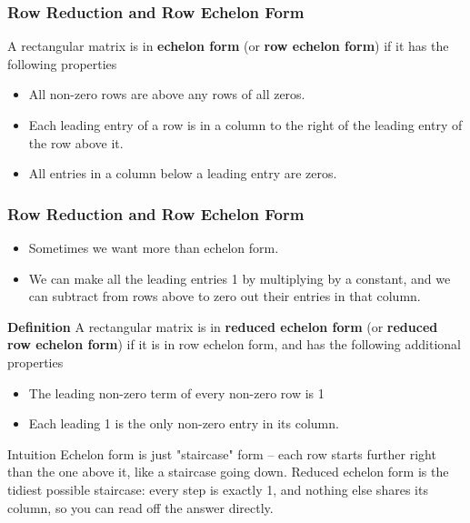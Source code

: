   \begin{frame}[fragile]\frametitle{Row Reduction and Row Echelon Form}
 A rectangular matrix is in \textbf{echelon form}
(or \textbf{row echelon form}) if it has the following properties
\begin{itemize}
 \item All non-zero rows are above any rows of all zeros.
 \item Each leading entry of a row is in a column to the right of the leading
 entry of the row above it.
 \item All entries in a column below a leading entry are zeros.
\end{itemize}

\end{frame}

  \begin{frame}[fragile]\frametitle{Row Reduction and Row Echelon Form}
\begin{itemize}
 \item Sometimes we want more than echelon form. 
 \item  We can make all the leading 
entries 1 by multiplying by a constant, and we can subtract from rows 
above to zero out their entries in that column.
\end{itemize}

\textbf{Definition} A rectangular matrix is in \textbf{reduced echelon form}
(or \textbf{reduced row echelon form}) if it is in row echelon form, and 
 has the following additional properties
\begin{itemize}
 \item The leading non-zero term of every non-zero row is 1
 \item Each leading 1 is the only non-zero entry in its column.
\end{itemize}

\begin{block}{Intuition}
Echelon form is just "staircase" form -- each row starts further right than the one above it, like a staircase going down. Reduced echelon form is the tidiest possible staircase: every step is exactly 1, and nothing else shares its column, so you can read off the answer directly.
\end{block}

\end{frame}

